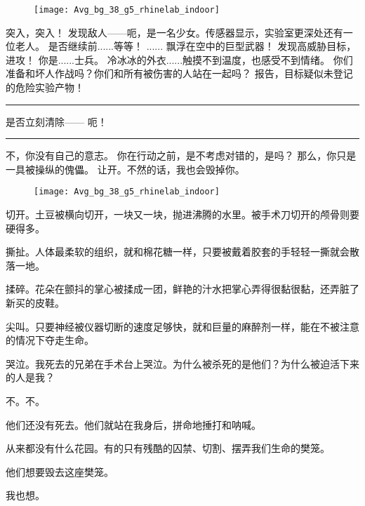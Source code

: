 \documentclass[openany]{book}
\begin{document}
\begin{figure}[h]
    \centering
    \texttt{[image: Avg\_bg\_38\_g5\_rhinelab\_indoor]}
\end{figure}
\begin{dialogue}
     突入，突入！
     发现敌人——呃，是一名少女。传感器显示，实验室更深处还有一位老人。
     是否继续前......等等！
     ......
     飘浮在空中的巨型武器！
     发现高威胁目标，进攻！
     你是......士兵。
     冷冰冰的外衣......触摸不到温度，也感受不到情绪。
     你们准备和坏人作战吗？你们和所有被伤害的人站在一起吗？
     报告，目标疑似未登记的危险实验产物！
    \par\noindent\rule{\textwidth}{0.4pt}
     是否立刻清除——
     呃！
    \par\noindent\rule{\textwidth}{0.4pt}
     不，你没有自己的意志。
     你在行动之前，是不考虑对错的，是吗？
     那么，你只是一具被操纵的傀儡。
     让开。不然的话，我也会毁掉你。
\end{dialogue}\par

\begin{figure}[h]
    \centering
    \texttt{[image: Avg\_bg\_38\_g5\_rhinelab\_indoor]}
\end{figure}
切开。土豆被横向切开，一块又一块，抛进沸腾的水里。被手术刀切开的颅骨则要硬得多。\par
撕扯。人体最柔软的组织，就和棉花糖一样，只要被戴着胶套的手轻轻一撕就会散落一地。\par
揉碎。花朵在颤抖的掌心被揉成一团，鲜艳的汁水把掌心弄得很黏很黏，还弄脏了新买的皮鞋。\par
尖叫。只要神经被仪器切断的速度足够快，就和巨量的麻醉剂一样，能在不被注意的情况下夺走生命。\par
哭泣。我死去的兄弟在手术台上哭泣。为什么被杀死的是他们？为什么被迫活下来的人是我？\par
不。不。\par
他们还没有死去。他们就站在我身后，拼命地捶打和呐喊。\par
从来都没有什么花园。有的只有残酷的囚禁、切割、摆弄我们生命的樊笼。\par
他们想要毁去这座樊笼。\par
我也想。
\end{document}
